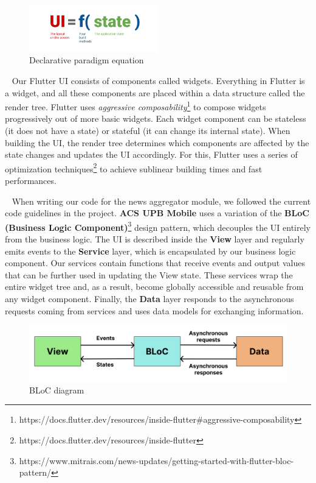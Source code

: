 \begin{figure}[ht]
    \centering
    \includegraphics[width=0.5\textwidth]{figures/app/miscellanous/ui-equals-function-of-state.png}
    \caption{Declarative paradigm equation}
    \label{4:fig:declarative-equation}
\end{figure}

~
Our Flutter UI consists of components called widgets. Everything in Flutter is a widget, and all these components are placed within a data structure called the render tree. Flutter uses \textit{aggressive composability}\footnote{https://docs.flutter.dev/resources/inside-flutter\#aggressive-composability} to compose widgets progressively out of more basic widgets. Each widget component can be stateless (it does not have a state) or stateful (it can change its internal state). When building the UI, the render tree determines which components are affected by the state changes and updates the UI accordingly. For this, Flutter uses a series of optimization techniques\footnote{https://docs.flutter.dev/resources/inside-flutter} to achieve sublinear building times and fast performances.

~
When writing our code for the news aggregator module, we followed the current code guidelines in the project.  \textbf{ACS UPB Mobile} uses a variation of the \textbf{BLoC (Business Logic Component)}\footnote{https://www.mitrais.com/news-updates/getting-started-with-flutter-bloc-pattern/} design pattern, which decouples the UI entirely from the business logic. The UI is described inside the \textbf{View} layer and regularly emits events to the \textbf{Service} layer, which is encapsulated by our business logic component. Our services contain functions that receive events and output values that can be further used in updating the View state. These services wrap the entire widget tree and, as a result, become globally accessible and reusable from any widget component. Finally, the \textbf{Data} layer responds to the asynchronous requests coming from services and uses data models for exchanging information.

\begin{figure}[ht]
    \centering
    \includegraphics[width=\textwidth]{figures/app/miscellanous/bloc-diagram.png}
    \caption{BLoC diagram}
    \label{4:fig:bloc-diagram}
\end{figure}

